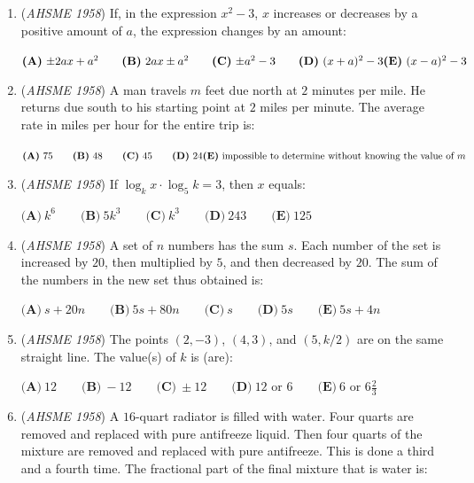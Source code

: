 \begin{enumerate}
 $\textbf{(A)}\ 5\qquad  \textbf{(B)}\ 4\qquad  \textbf{(C)}\ 3\qquad  \textbf{(D)}\ 2\qquad  \textbf{(E)}\ 1$


	\item (\textit{AHSME 1958}) If, in the expression $x^2 - 3$, $x$ increases or decreases by a positive amount of $a$, the expression changes by an amount:


 $\textbf{(A)}\ {\pm 2ax + a^2}\qquad  \textbf{(B)}\ {2ax \pm a^2}\qquad  \textbf{(C)}\ {\pm a^2 - 3} \qquad  \textbf{(D)}\ {(x + a)^2 - 3}\qquad\\  \textbf{(E)}\ {(x - a)^2 - 3}$


	\item (\textit{AHSME 1958}) A man travels $m$ feet due north at $2$ minutes per mile. He returns due south to his starting point at $2$ miles per minute. The average rate in miles per hour for the entire trip is:


 $\textbf{(A)}\ 75\qquad  \textbf{(B)}\ 48\qquad  \textbf{(C)}\ 45\qquad  \textbf{(D)}\ 24\qquad\\  \textbf{(E)}\ \text{impossible to determine without knowing the value of }{m}$


	\item (\textit{AHSME 1958}) If $\log_{k}{x}\cdot \log_{5}{k} = 3$, then $x$ equals:


 $\textbf{(A)}\ k^6\qquad  \textbf{(B)}\ 5k^3\qquad  \textbf{(C)}\ k^3\qquad  \textbf{(D)}\ 243\qquad  \textbf{(E)}\ 125$


	\item (\textit{AHSME 1958}) A set of $n$ numbers has the sum $s$. Each number of the set is increased by $20$, then multiplied by $5$, and then decreased by $20$. The sum of the numbers in the new set thus obtained is:


 $\textbf{(A)}\ s + 20n\qquad  \textbf{(B)}\ 5s + 80n\qquad  \textbf{(C)}\ s\qquad  \textbf{(D)}\ 5s\qquad  \textbf{(E)}\ 5s + 4n$


	\item (\textit{AHSME 1958}) The points $(2,-3)$, $(4,3)$, and $(5, k/2)$ are on the same straight line. The value(s) of $k$ is (are):


 $\textbf{(A)}\ 12\qquad  \textbf{(B)}\ -12\qquad  \textbf{(C)}\ \pm 12\qquad  \textbf{(D)}\ {12}\text{ or }{6}\qquad  \textbf{(E)}\ {6}\text{ or }{6\frac{2}{3}}$


	\item (\textit{AHSME 1958}) A $16$-quart radiator is filled with water. Four quarts are removed and replaced with pure antifreeze liquid. Then four quarts of the mixture are removed and replaced with pure antifreeze. This is done a third and a fourth time. The fractional part of the final mixture that is water is:



\end{enumerate}
